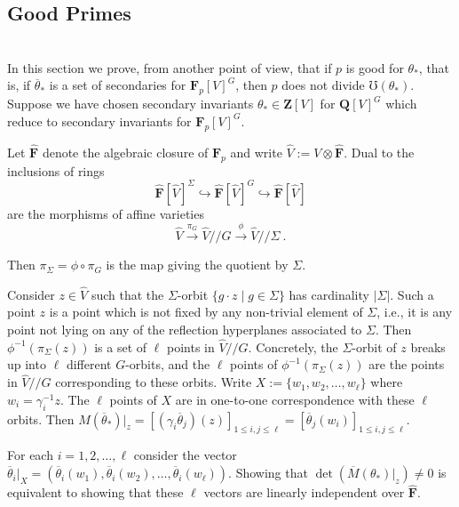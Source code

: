 \documentclass[12pt]{amsart}
\renewcommand{\leq}{\leqslant}
\newcommand{\QQ}{\mathbf{Q}} %
\newcommand{\ZZ}{\mathbf{Z}} %
\newcommand{\FF}{\mathbf{F}} %
\newcommand{\QQ}{\mathbb{Q}} %
\newcommand{\ZZ}{\mathbb{Z}} %
\newcommand{\FF}{\mathbb{F}} %
\theoremstyle{definition}
\newcommand{\hVmodG}{{\widehat{V}/\!\!/G}}
\newcommand{\hVmodSigma}{{\widehat{V}/\!\!/\Sigma}}
\newcommand{\bth}{{{\theta_*}}} %
\begin{document}
 \subsection{Good Primes}\label{good primes}\ \\
 In this section we prove, from another point of view, that if $p$ is good for $\bth$, that is, if $\overline{\theta}_*$ is a set of secondaries for $\FF_p[V]^G$, then $p$ does not divide $\mho(\bth)$. 
    Suppose we have chosen secondary invariants 
    $\bth \in \ZZ[V]$
    for $\QQ[V]^G$ which reduce to secondary invariants for $\FF_p[V]^G$.
    
    
 Let $\widehat{\FF}$ denote the algebraic closure of $\FF_p$ and write $\widehat{V} := V \otimes \widehat{\FF}$.
 Dual to the inclusions of rings $$\widehat{\FF}[\widehat{V}]^{\Sigma} \hookrightarrow \widehat{\FF}[\widehat{V}]^G \hookrightarrow \widehat{\FF}[\widehat{V}]$$
  are the morphisms of affine varieties
$$\widehat{V} \stackrel{\pi_G}{\longrightarrow}\hVmodG \stackrel{\phi}{\longrightarrow}  \hVmodSigma\ .$$

Then $\pi_{\Sigma} = \phi \circ \pi_G$ is the map giving the 
quotient by $\Sigma$.
  
  Consider $z \in \widehat{V}$ such that the $\Sigma$-orbit $\{g\cdot z \mid g \in\Sigma\}$ has cardinality $|\Sigma|$.
  Such a point $z$ is a point which is not fixed by any non-trivial element 
  of $\Sigma$, i.e., it is any point not lying on any of the reflection hyperplanes
  associated to $\Sigma$.  
   Then $\phi^{-1}(\pi_{\Sigma}(z))$ is a set of $\ell$ points in $\hVmodG$.    Concretely, the 
   $\Sigma$-orbit of $z$ breaks up into $\ell$ different $G$-orbits, and the $\ell$ points of 
   $\phi^{-1}(\pi_{\Sigma}(z))$ are the points in $\hVmodG$ corresponding to these orbits.   
   Write 
   $X := \{w_1,w_2,\dots, w_{\ell}\}$ where $w_i=\gamma_i^{-1} z$. The $\ell$ points of $X$ 
   are in one-to-one correspondence with these $\ell$ orbits. 
   Then $M(\overline{\theta}_*)|_z = [(\gamma_i \overline{\theta}_j)(z)]_{1 \leq i,j \leq \ell} = [\overline{\theta}_j(w_i)]_{1 \leq i,j \leq \ell}$. 
   
  For each $i=1,2,\dots,\ell$ consider the vector $\overline{\theta}_i|_X=
(\overline{\theta}_i(w_1),\overline{\theta}_i(w_2),\dots,\overline{\theta}_i(w_\ell))$.
     Showing that
   $\det (\overline{M}(\bth)|_z) \ne 0$ is equivalent to showing that these $\ell$ vectors are linearly independent over 
   $\widehat{\FF}$.
\end{document}
